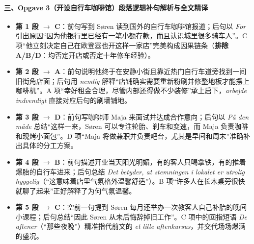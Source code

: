 \paragraph*{三、Opgave 3（开设自行车咖啡馆）段落逻辑补句解析与全文精译}
\begin{itemize}
  \item \textbf{第 1 段 $\rightarrow$ C}：前句写到 Søren 读到国外的自行车咖啡馆报道；后句以 \textit{For} 引出原因“因为他银行里已经有一笔小额存款，而且认识城里很多骑车人”。C 项“他立刻决定自己在欧登塞也开这样一家店”完美构成因果链条（\textbf{排除 A/B/D}：均否定开店或否定十年修车经验）。
  \item \textbf{第 2 段 $\rightarrow$ A}：前句说明他终于在安静小街且靠近热门自行车道旁找到一间旧街角店面；后句用 \textit{nemlig} 解释“店铺确实需要重新粉刷并修整地板才能摆上咖啡机”。A 项“幸好租金合理，尽管内部还得做不少装修”承上启下，\textit{arbejde indvendigt} 直接对应后句的刷墙铺地。
  \item \textbf{第 3 段 $\rightarrow$ D}：前句写咖啡师 Maja 来面试并达成合作意向；后句以 \textit{På den måde} 总结“这样一来，Søren 可以专注轮胎、刹车和变速，而 Maja 负责咖啡和现烤小面包”。D 项“Maja 将做兼职并负责吧台，尤其是早间和周末”准确补出具体的分工方案。
  \item \textbf{第 4 段 $\rightarrow$ B}：前句描述开业当天阳光明媚，有的客人只喝拿铁，有的推着爆胎的自行车进来；后句总结 \textit{Det betyder, at stemningen i lokalet er utrolig hyggelig}（“这意味着店里气氛格外温馨舒适”）。B 项“许多人在长木桌旁很快就聊了起来”正好解释了为何气氛温馨。
  \item \textbf{第 5 段 $\rightarrow$ C}：空前一句提到 Søren 每月还举办一次教客人自己补胎的晚间小课程；后句总结“因此 Søren 从未后悔辞掉旧工作”。C 项中的回指短语 \textit{De aftener}（“那些夜晚”）精准指代前文的 \textit{et lille aftenkursus}，并交代场场爆满的盛况。
\end{itemize}

